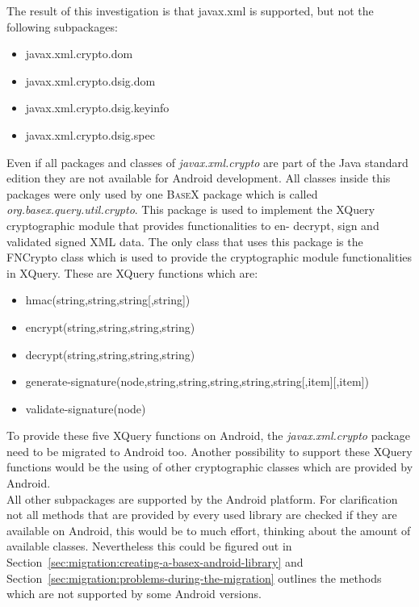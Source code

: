 The result of this investigation is that javax.xml is supported, but not the following subpackages:
\begin{itemize}
  \item javax.xml.crypto.dom
  \item javax.xml.crypto.dsig.dom
  \item javax.xml.crypto.dsig.keyinfo
  \item javax.xml.crypto.dsig.spec
\end{itemize}
Even if all packages and classes of \textit{javax.xml.crypto} are part of the Java standard edition they are not available for Android development.
All classes inside this packages were only used by one \textsc{BaseX} package which is called \textit{org.basex.query.\-util.crypto}.
This package is used to implement the XQuery cryptographic module that provides functionalities to en- decrypt, sign and validated signed XML data.
The only class that uses this package is the FNCrypto class which is used to provide the cryptographic module functionalities in XQuery.
These are XQuery functions which are:
\begin{itemize}
  \item hmac(string,string,string[,string])
  \item encrypt(string,string,string,string)
  \item decrypt(string,string,string,string)
  \item generate-signature(node,string,string,string,string,string[,item][,item])
  \item validate-signature(node)
\end{itemize}
To provide these five XQuery functions on Android, the \textit{javax.xml.crypto} package need to be migrated to Android too.
Another possibility to support these XQuery functions would be the using of other cryptographic classes which are provided by Android.\\
All other subpackages are supported by the Android platform.
For clarification not all methods that are provided by every used library are checked if they are available on Android, this would be to much effort, thinking about the amount of available classes.
Nevertheless this could be figured out in Section~\ref{sec:migration:creating-a-basex-android-library} and Section~\ref{sec:migration:problems-during-the-migration} outlines the methods which are not supported by some Android versions.

